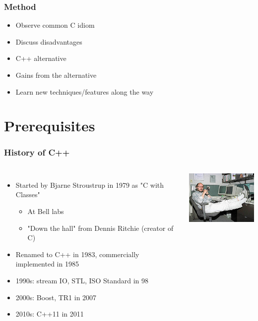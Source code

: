 \documentclass[table]{beamer}
\newcommand{\declarelesson}{\textbf{\color{themegreen}{Lesson:}} }
\begin{document}
\begin{frame}
    \frametitle{Method}
    \begin{itemize}
        \item<1->Observe common C idiom
        \item<1->Discuss disadvantages
        \item<1->C++ alternative
        \item<1->Gains from the alternative
        \item<2->Learn new techniques/features along the way
    \end{itemize}
\end{frame}


\section{Prerequisites}
\frame{\sectionpage}

\begin{frame}
    \frametitle{\declarelesson History of C++}
    \begin{columns}[t]
        \column{7cm}
        \begin{itemize}
            \item<1->Started by Bjarne Stroustrup in 1979 as "C with Classes"
                \begin{itemize}
                    \item At Bell labs
                    \item "Down the hall" from Dennis Ritchie (creator of C)
                \end{itemize}
            \item<1->Renamed to C++ in 1983, commercially implemented in 1985
            \item<2->1990s: stream IO, STL, ISO Standard in 98
            \item<3->2000s: Boost, TR1 in 2007
            \item<4->2010s: C++11 in 2011
        \end{itemize}
        \column[T]{4cm}
        \includegraphics[width=4cm]{220px-BjarneStroustrup.jpg}
    \end{columns}
\end{frame}
\end{document}
